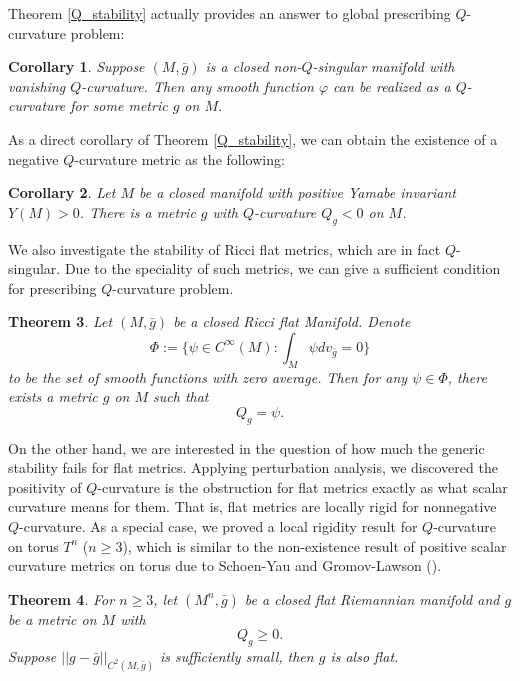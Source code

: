\documentclass[12pt]{amsart}
\newtheorem{theorem}{Theorem}[section]
\newtheorem{corollary}[theorem]{Corollary}
\theoremstyle{definition}
\theoremstyle{remark}
\numberwithin{equation}{section}
\begin{document}
Theorem \ref{Q_stability} actually provides an answer to global prescribing $Q$-curvature problem:
\begin{corollary}\label{cor:prescribing_zero_Q}
Suppose $(M, \bar g)$ is a closed non-$Q$-singular manifold with vanishing $Q$-curvature. Then any smooth function $\varphi$ can be realized as a $Q$-curvature for some metric $ g$ on $M$.
\end{corollary}

As a direct corollary of Theorem \ref{Q_stability}, we can obtain the existence of a negative $Q$-curvature metric as the following: 
\begin{corollary}\label{cor:pos_Y_negative_Q}
Let $M$ be a closed manifold with positive Yamabe invariant $Y(M) > 0$. There is a metric $g$ with $Q$-curvature $Q_g < 0$ on $M$. 
\end{corollary}

We also investigate the stability of Ricci flat metrics, which are in fact $Q$-singular. Due to the speciality of such metrics, we can give a sufficient condition for prescribing $Q$-curvature problem.
\begin{theorem}\label{Ricci_flat_stability}
Let $(M,\bar{g})$ be a closed Ricci flat Manifold. Denote $$\Phi:=\{\psi \in C^{\infty}(M): \int_M \psi dv_{\bar{g}} = 0\}$$ to be the set of smooth functions with zero average. Then for any $\psi \in \Phi$, there exists a metric $g$ on $M$ such that $$Q_g = \psi.$$

\end{theorem}

On the other hand, we are interested in the question of how much the generic stability fails for flat metrics. Applying perturbation analysis, we discovered the positivity of $Q$-curvature is the obstruction for flat metrics exactly as what scalar curvature means for them. That is, flat metrics are locally rigid for nonnegative $Q$-curvature. As a special case, we proved a local rigidity result for $Q$-curvature on torus $T^n$ ($n \geq 3$), which is  similar to the non-existence result of positive scalar curvature metrics on torus due to Schoen-Yau and Gromov-Lawson (\cite{S-Y_1, S-Y_2, G-L_1, G-L_2}).

\begin{theorem}\label{flat_local_rigidity}
For $n \geq 3$, let $(M^n,\bar{g})$ be a closed flat Riemannian manifold and $g$ be a metric on $M$ with $$Q_g \geq 0.$$ Suppose $||g - \bar{g}||_{C^2(M, \bar{g})}$ is sufficiently small, then $g$ is also flat.
\end{theorem}
\end{document}
